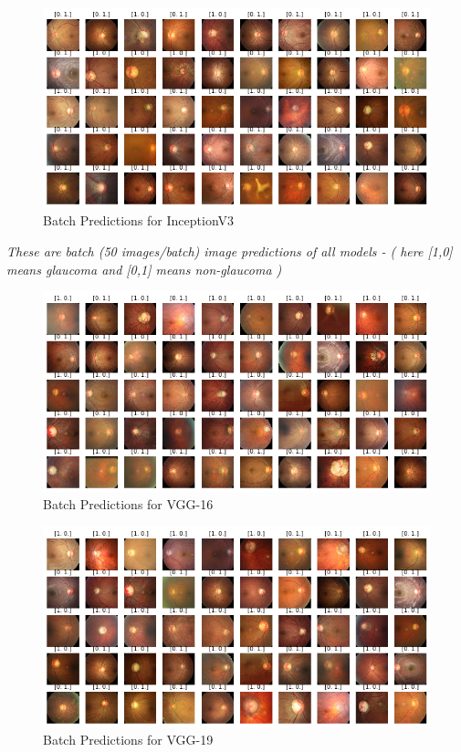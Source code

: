\vspace{5mm}
\begin{figure}[hbt!]
\centering
\includegraphics[scale=0.6]{images/fig-55.png}
\caption{Batch Predictions for InceptionV3}
\label{fig:x Batch Predictions for InceptionV3}
\end{figure}

\newpage
\vspace{5mm}
\textit{These are batch (50 images/batch) image predictions of all models - ( here [1,0] means glaucoma and [0,1] means non-glaucoma )}

\vspace{5mm}
\begin{figure}[hbt!]
\centering
\includegraphics[scale=0.6]{images/fig-56.png}
\caption{Batch Predictions for VGG-16}
\label{fig:x Batch Predictions for VGG-16}
\end{figure}

\vspace{5mm}
\begin{figure}[hbt!]
\centering
\includegraphics[scale=0.6]{images/fig-57.png}
\caption{Batch Predictions for VGG-19}
\label{fig:x Batch Predictions for VGG-19}
\end{figure}

